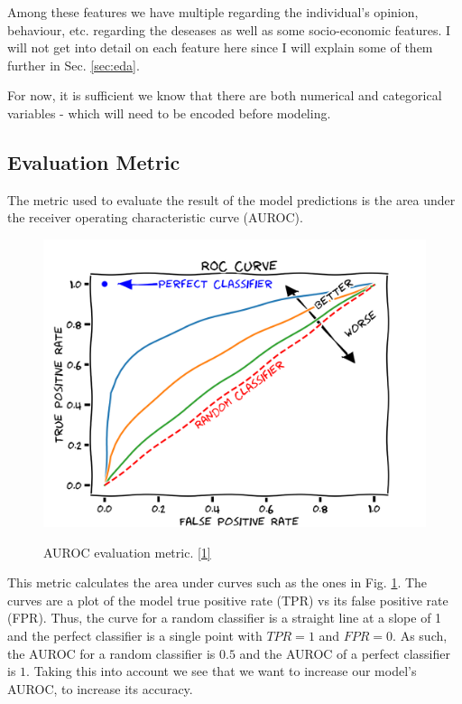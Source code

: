 \documentclass[10pt,a4paper]{article}
\begin{document}
Among these features we have multiple regarding the individual's opinion, behaviour, etc. regarding the deseases as well as some socio-economic features. I will not get into detail on each feature here since I will explain some of them further in Sec. \ref{sec:eda}.

For now, it is sufficient we know that there are both numerical and categorical variables - which will need to be encoded before modeling.

\subsection{Evaluation Metric}

The metric used to evaluate the result of the model predictions is the area under the receiver operating characteristic curve (AUROC).

\begin{figure}[H]
\centering
\includegraphics[scale=0.2]{auroc.png}
\label{fig:auroc}
\caption{AUROC evaluation metric. \href{https://commons.wikimedia.org/wiki/File:Roc-draft-xkcd-style.svg}{[1]}}
\end{figure}

This metric calculates the area under curves such as the ones in Fig. \ref{fig:auroc}. The curves are a plot of the model true positive rate (TPR) vs its false positive rate (FPR). Thus, the curve for a random classifier is a straight line at a slope of 1 and the perfect classifier is a single point with $TPR = 1$ and $FPR = 0$. As such, the AUROC for a random classifier is $0.5$ and the AUROC of a perfect classifier is $1$. Taking this into account we see that we want to increase our model's AUROC, to increase its accuracy.
\end{document}

